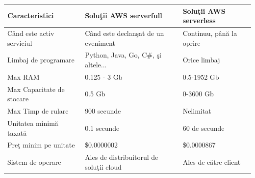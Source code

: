 \documentclass[a4paper,12pt]{report}
\begin{document}
\begin{table}[h]
\begin{tabular}{|l|l|l|}
\hline
Caracteristici             & Soluţii AWS serverfull                  & Soluţii AWS serverless                           \\ \hline
Când este activ serviciul & Când este declanşat de un eveniment     & Continuu, până la oprire \\ \hline
Limbaj de programare      & Python, Java, Go, C\#,  şi altele...    & Orice limbaj                                     \\ \hline
Max RAM                   & 0.125 - 3 Gb                            & 0.5-1952 Gb                                      \\ \hline
Max Capacitate de stocare & 0.5 Gb                                  & 0-3600 Gb                                        \\ \hline
Max Timp de rulare        & 900 secunde                             & Nelimitat                                        \\ \hline
Unitatea minimă taxată    & 0.1 secunde                             & 60 de secunde                                    \\ \hline
Preţ minim pe unitate     & \$0.0000002                             & \$0.0000867                                      \\ \hline
Sistem de operare         & Ales de distribuitorul de soluţii cloud & Ales de către client                             \\ \hline
\end{tabular}
\end{table}
\end{document}
